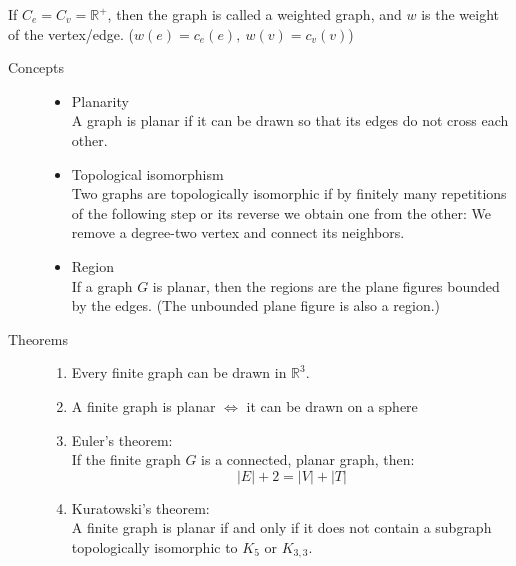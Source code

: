 \documentclass[margin=0px]{article}
\newcommand{\R}{\mathbb{R}}
\begin{document}
\begin{description}
\begin{itemize}
                  If $C_e = C_v = \R^+$, then the graph is called a weighted graph, and $w$ is the weight of the vertex/edge. (${w(e)=c_e(e)},\ {w(v) = c_v(v)}$)
        \end{itemize}
    \item[Planarity] \hfill
        \begin{description}
            \item[Concepts] \hfill
                \begin{itemize}
                    \item Planarity \\
                          A graph is planar if it can be drawn so that its edges do not cross each other.
                    \item Topological isomorphism \\
                          Two graphs are topologically isomorphic if by finitely many repetitions of the following step or its reverse we obtain one from the other: We remove a degree-two vertex and connect its neighbors.
                    \item Region \\
                          If a graph $G$ is planar, then the regions are the plane figures bounded by the edges. (The unbounded plane figure is also a region.)
                \end{itemize}
            \item[Theorems] \hfill
                \begin{enumerate}
                    \item Every finite graph can be drawn in $\R^3$.
                    \item A finite graph is planar $\Longleftrightarrow$ it can be drawn on a sphere
                    \item Euler's theorem: \\
                          If the finite graph $G$ is a connected, planar graph, then:
                          \[|E|+2 = |V|+|T|\]
                    \item Kuratowski's theorem: \\
                          A finite graph is planar if and only if it does not contain a subgraph topologically isomorphic to $K_5$ or $K_{3,3}$.
                \end{enumerate}
        \end{description}
\end{description}
\end{document}
